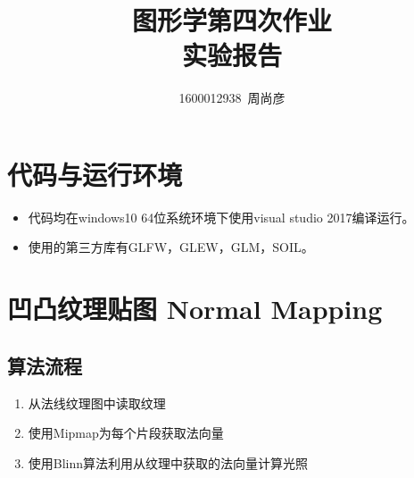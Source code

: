 \documentclass[11pt,UTF8]{article}
\title{\fontsize{25pt}{\baselineskip}\textbf{图形学第四次作业\\[2ex]实验报告}}
\author{1600012938~周尚彦}
\begin{document}
\thispagestyle{plain}

\maketitle

\tableofcontents

\setcounter{section}{0}

\section{代码与运行环境}
	\begin{itemize}
		\item 代码均在windows10 64位系统环境下使用visual studio 2017编译运行。
		\item 使用的第三方库有GLFW，GLEW，GLM，SOIL。
	\end{itemize}
\newpage

\section{凹凸纹理贴图 Normal Mapping}
\subsection{算法流程}
	\begin{enumerate}
		\item 从法线纹理图中读取纹理
		\item 使用Mipmap为每个片段获取法向量
		\item 使用Blinn算法利用从纹理中获取的法向量计算光照
	\end{enumerate}
\end{document}
